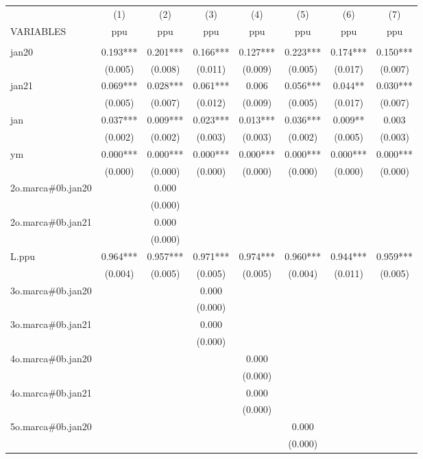 \begin{tabular}{lccccccc} \hline
 & (1) & (2) & (3) & (4) & (5) & (6) & (7) \\
VARIABLES & ppu & ppu & ppu & ppu & ppu & ppu & ppu \\ \hline
 &  &  &  &  &  &  &  \\
jan20 & 0.193*** & 0.201*** & 0.166*** & 0.127*** & 0.223*** & 0.174*** & 0.150*** \\
 & (0.005) & (0.008) & (0.011) & (0.009) & (0.005) & (0.017) & (0.007) \\
jan21 & 0.069*** & 0.028*** & 0.061*** & 0.006 & 0.056*** & 0.044** & 0.030*** \\
 & (0.005) & (0.007) & (0.012) & (0.009) & (0.005) & (0.017) & (0.007) \\
jan & 0.037*** & 0.009*** & 0.023*** & 0.013*** & 0.036*** & 0.009** & 0.003 \\
 & (0.002) & (0.002) & (0.003) & (0.003) & (0.002) & (0.005) & (0.003) \\
ym & 0.000*** & 0.000*** & 0.000*** & 0.000*** & 0.000*** & 0.000*** & 0.000*** \\
 & (0.000) & (0.000) & (0.000) & (0.000) & (0.000) & (0.000) & (0.000) \\
2o.marca\#0b.jan20 &  & 0.000 &  &  &  &  &  \\
 &  & (0.000) &  &  &  &  &  \\
2o.marca\#0b.jan21 &  & 0.000 &  &  &  &  &  \\
 &  & (0.000) &  &  &  &  &  \\
L.ppu & 0.964*** & 0.957*** & 0.971*** & 0.974*** & 0.960*** & 0.944*** & 0.959*** \\
 & (0.004) & (0.005) & (0.005) & (0.005) & (0.004) & (0.011) & (0.005) \\
3o.marca\#0b.jan20 &  &  & 0.000 &  &  &  &  \\
 &  &  & (0.000) &  &  &  &  \\
3o.marca\#0b.jan21 &  &  & 0.000 &  &  &  &  \\
 &  &  & (0.000) &  &  &  &  \\
4o.marca\#0b.jan20 &  &  &  & 0.000 &  &  &  \\
 &  &  &  & (0.000) &  &  &  \\
4o.marca\#0b.jan21 &  &  &  & 0.000 &  &  &  \\
 &  &  &  & (0.000) &  &  &  \\
5o.marca\#0b.jan20 &  &  &  &  & 0.000 &  &  \\
 &  &  &  &  & (0.000) &  &  \\

\end{tabular}
